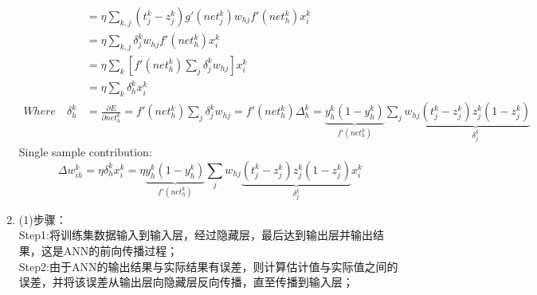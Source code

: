 \documentclass[a4paper,11pt,onecolumn,oneside,UTF8]{article}
\begin{document}
\begin{enumerate}
$$\begin{aligned}
                                         & =\eta\sum\limits_{k,j}\left(t_j^k-z_j^k\right)g'\left(net_j^k\right)w_{hj}f'\left(net_h^k\right)x_i^k                                                                                                                                                                                         \\
                                         & =\eta\sum\limits_{k,j}\delta_j^kw_{hj}f'\left(net_h^k\right)x_i^k                                                                                                                                                                                                                             \\
                                         & =\eta\sum\limits_{k}\left[f'\left(net_h^k\right)\sum\limits_{j}\delta_j^kw_{hj}\right]x_i^k                                                                                                                                                                                                   \\
                                         & =\eta\sum\limits_{k}\delta_h^kx_i^k                                                                                                                                                                                                                                                           \\
                  Where \quad \delta_h^k & =\frac{\partial E}{\partial net_{h}^k}=f'\left(net_h^k\right)\sum\limits_{j}\delta_j^kw_{hj}=f'\left(net_h^k\right)\Delta_h^k=\underbrace{y_h^k\left(1-y_h^k\right)}_{f'\left(net_h^k\right)}\sum\limits_{j}w_{hj}\underbrace{\left(t_j^k-z_j^k\right)z_j^k\left(1-z_j^k\right)}_{\delta_j^k}
              \end{aligned}
          $$
          Single sample contribution:
          $$
              \Delta w_{ih}^k =\eta\delta_h^kx_i^k  =\eta\underbrace{y_h^k\left(1-y_h^k\right)}_{f'\left(net_h^k\right)}\sum\limits_{j}w_{hj}\underbrace{\left(t_j^k-z_j^k\right)z_j^k\left(1-z_j^k\right)}_{\delta_j^k}x_i^k
          $$
    \item
          (1)步骤：\\
          Step1:将训练集数据输入到输入层，经过隐藏层，最后达到输出层并输出结果，这是ANN的前向传播过程；\\
          Step2:由于ANN的输出结果与实际结果有误差，则计算估计值与实际值之间的误差，并将该误差从输出层向隐藏层反向传播，直至传播到输入层；\\

\end{enumerate}
\end{document}
